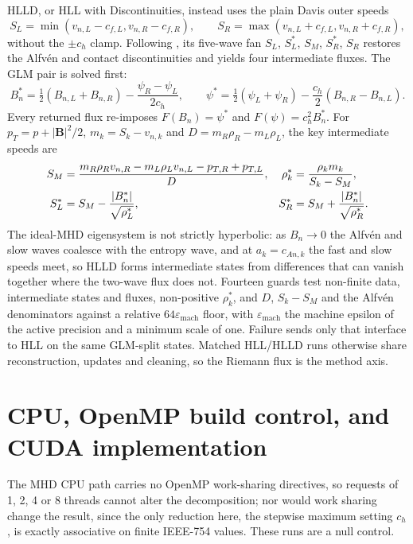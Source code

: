 HLLD, or HLL with Discontinuities, instead uses the plain Davis outer speeds
\begin{equation}
 S_L=\min(v_{n,L}-c_{f,L},v_{n,R}-c_{f,R}),\qquad
 S_R=\max(v_{n,L}+c_{f,L},v_{n,R}+c_{f,R}),
 \label{eq:ch2-hlld-outer-speeds}
\end{equation}
without the $\pm c_h$ clamp. Following \citet{miyoshi_kusano_2005}, its
five-wave fan $S_L$, $S_L^*$, $S_M$, $S_R^*$, $S_R$ restores the Alfv\'en and
contact discontinuities and yields four intermediate fluxes. The GLM pair is
solved first:
\begin{equation}
 B_n^*=\tfrac12(B_{n,L}+B_{n,R})-\frac{\psi_R-\psi_L}{2c_h},\qquad
 \psi^*=\tfrac12(\psi_L+\psi_R)-\frac{c_h}{2}(B_{n,R}-B_{n,L}).
 \label{eq:ch2-hlld-glm-star}
\end{equation}
Every returned flux re-imposes $F(B_n)=\psi^*$ and
$F(\psi)=c_h^2B_n^*$. For $p_T=p+|\mathbf B|^2/2$,
$m_k=S_k-v_{n,k}$ and $D=m_R\rho_R-m_L\rho_L$, the key intermediate speeds are
\begin{align}
 S_M&=\frac{m_R\rho_Rv_{n,R}-m_L\rho_Lv_{n,L}-p_{T,R}+p_{T,L}}{D},&
 \rho_k^*&=\frac{\rho_km_k}{S_k-S_M},\notag\\
 S_L^*&=S_M-\frac{|B_n^*|}{\sqrt{\rho_L^*}},&
 S_R^*&=S_M+\frac{|B_n^*|}{\sqrt{\rho_R^*}}.
 \label{eq:ch2-hlld-speeds}
\end{align}
The ideal-MHD eigensystem is not strictly hyperbolic: as $B_n\to0$ the Alfv\'en
and slow waves coalesce with the entropy wave, and at $a_k=c_{An,k}$ the fast
and slow speeds meet, so HLLD forms intermediate states from differences that
can vanish together \citep{roeBalsara1996eigen} where the two-wave flux does not.
Fourteen guards test non-finite data, intermediate states and fluxes,
non-positive $\rho_k^*$, and $D$, $S_k-S_M$ and the Alfv\'en denominators
against a relative $64\varepsilon_{\mathrm{mach}}$ floor, with
$\varepsilon_{\mathrm{mach}}$ the machine epsilon of the active precision and a
minimum scale of one. Failure sends only that interface to HLL on the same
GLM-split states. Matched HLL/HLLD runs otherwise share reconstruction, updates
and cleaning, so the Riemann flux is the method axis.

\section{CPU, OpenMP build control, and CUDA implementation}
\label{sec:ch2-execution}

The MHD CPU path carries no OpenMP work-sharing directives, so requests of 1, 2,
4 or 8 threads cannot alter the decomposition; nor would work sharing change the
result, since the only reduction here, the stepwise maximum setting $c_h$, is
exactly associative on finite IEEE-754 values. These runs are a null control.


